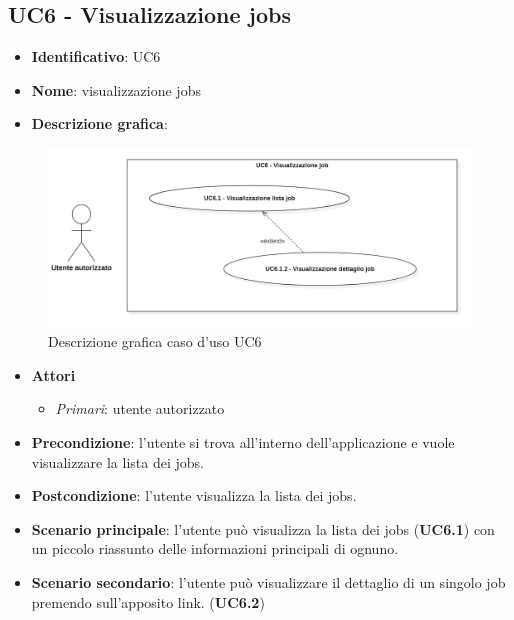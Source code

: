 
\subsection{UC6 - Visualizzazione jobs}
\begin{itemize}
  \item \textbf{Identificativo}: UC6
  \item \textbf{Nome}: visualizzazione jobs
  \item \textbf{Descrizione grafica}:
\end{itemize}

\begin{figure}[H]
  \centering
  \includegraphics[width=\textwidth]{immagini/usecase/UC6.png}
  \caption{Descrizione grafica caso d'uso UC6}
\end{figure}

\begin{itemize}
  \item \textbf{Attori}
        \begin{itemize}
          \item \textit{Primari}: utente autorizzato
        \end{itemize}
  \item \textbf{Precondizione}: l'utente si trova all'interno dell'applicazione e vuole visualizzare la lista dei jobs.
  \item \textbf{Postcondizione}: l'utente visualizza la lista dei jobs.
  \item \textbf{Scenario principale}: l'utente può visualizza la lista dei jobs (\textbf{UC6.1}) con un piccolo riassunto delle informazioni principali di ognuno.
  \item \textbf{Scenario secondario}: l'utente può visualizzare il dettaglio di un singolo job premendo sull'apposito link. (\textbf{UC6.2})
\end{itemize}

